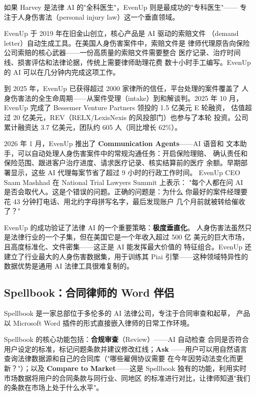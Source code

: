 如果 Harvey 是法律 AI 的"全科医生"，EvenUp 则是最成功的"专科医生"——
专注于人身伤害法（personal injury law）这一个垂直领域。

EvenUp 于 2019 年在旧金山创立，核心产品是 AI 驱动的索赔文件
（demand letter）自动生成工具。在美国人身伤害案件中，索赔文件是
律师代理原告向保险公司索赔的核心武器——一份高质量的索赔文件需要整合
医疗记录、治疗时间线、损害评估和法律论据，传统上需要律师助理花费
数十小时手工编写。EvenUp 的 AI 可以在几分钟内完成这项工作。

到 2025 年，EvenUp 已获得超过 2000 家律所的信任，平台处理的案件覆盖了
人身伤害法的全生命周期——从案件受理（intake）到和解谈判。2025 年 10
月，EvenUp 完成了 Bessemer Venture Partners 领投的 1.5 亿美元 E 轮融资，
估值超过 20 亿美元，REV（RELX/LexisNexis 的风投部门）也参与了本轮
投资。公司累计融资达 3.7 亿美元，团队约 605 人（同比增长 62\%）。

2026 年 1 月，EvenUp 推出了 \textbf{Communication Agents}——AI 语音和
文本助手，可以自动处理人身伤害案件中的常规沟通任务：开启保险理赔、
确认责任和保险范围、跟进客户治疗进度、请求医疗记录、核实结算前的医疗
余额。早期部署显示，这些 AI 代理每案节省了超过 9 小时的行政工作时间。
EvenUp CEO Saam Mashhad 在 National Trial Lawyers Summit 上表示：
"每个人都在问 AI 是否会取代人。这是个错误的问题。正确的问题是：为什么
你最好的案件经理要花 43 分钟打电话、用北约字母拼写名字，最后发现账户
几个月前就被转给催收了？"

EvenUp 的成功验证了法律 AI 的一个重要策略：\textbf{极度垂直化}。
人身伤害法虽然只是法律行业的一个子集，但在美国它是一个年收入超过 500 亿
美元的巨大市场，且高度标准化、文件密集——这正是 AI 能发挥最大价值的
特征组合。EvenUp 还建立了行业最大的人身伤害数据集，用于训练其 Piai
引擎——这种领域特异性的数据优势是通用 AI 法律工具很难复制的。


\subsection{Spellbook：合同律师的 Word 伴侣}
\label{subsec:spellbook}

Spellbook 是一家总部位于多伦多的 AI 法律公司，专注于合同审查和起草，
产品以 Microsoft Word 插件的形式直接嵌入律师的日常工作环境。

Spellbook 的核心功能包括：\textbf{合规审查}（Review）——AI 自动检查
合同是否符合用户设定的标准，标记问题条款并建议修改红线；\textbf{Ask}
——用户可以用自然语言查询法律数据源和自己的合同库（"哪些雇佣协议需要
在今年因劳动法变化而更新？"）；以及 \textbf{Compare to Market}——这是
Spellbook 独有的功能，利用实时市场数据将用户的合同条款与同行业、同地区
的标准进行对比，让律师知道"我们的条款在市场上处于什么水平"。

